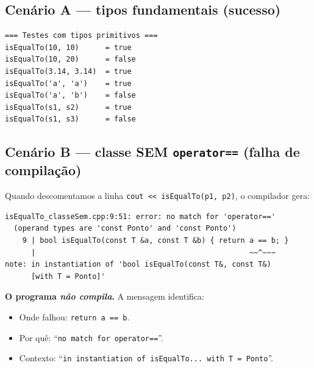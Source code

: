 \documentclass[11pt,a4paper]{article}
\begin{document}
\subsection*{Cen\'ario A --- tipos fundamentais (sucesso)}



\begin{saidabox}
\begin{lstlisting}[style=terminal]
=== Testes com tipos primitivos ===
isEqualTo(10, 10)      = true
isEqualTo(10, 20)      = false
isEqualTo(3.14, 3.14)  = true
isEqualTo('a', 'a')    = true
isEqualTo('a', 'b')    = false
isEqualTo(s1, s2)      = true
isEqualTo(s1, s3)      = false
\end{lstlisting}
\end{saidabox}\normalcolor

\subsection*{Cen\'ario B --- classe SEM \texttt{operator==} (falha de compila\c{c}\~ao)}



Quando descomentamos a linha \texttt{cout << isEqualTo(p1, p2)}, o compilador gera:

\begin{saidabox}
\begin{lstlisting}[style=terminal]
isEqualTo_classeSem.cpp:9:51: error: no match for 'operator=='
  (operand types are 'const Ponto' and 'const Ponto')
    9 | bool isEqualTo(const T &a, const T &b) { return a == b; }
      |                                                 ~~^~~~
note: in instantiation of 'bool isEqualTo(const T&, const T&)
      [with T = Ponto]'
\end{lstlisting}
\end{saidabox}\normalcolor

\textbf{O programa \emph{n\~ao compila}.} A mensagem identifica:

\begin{itemize}[leftmargin=*,itemsep=0pt]
  \item Onde falhou: \texttt{return a == b}.
  \item Por qu\^e: ``\texttt{no match for operator==}''.
  \item Contexto: ``\texttt{in instantiation of isEqualTo... with T = Ponto}''.
\end{itemize}
\end{document}
